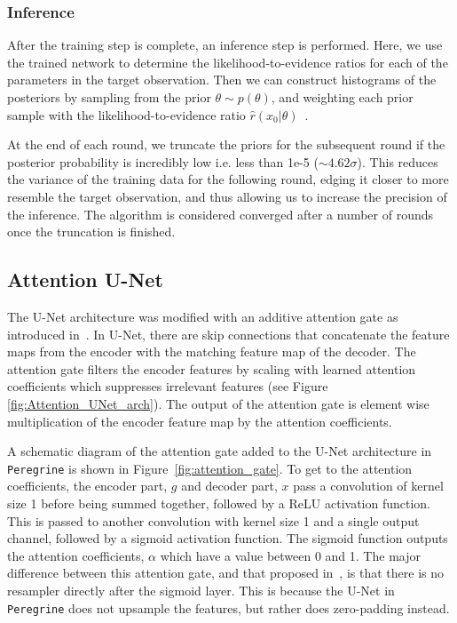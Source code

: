 \subsubsection{Inference}

After the training step is complete, an inference step is performed. Here, we use the trained network to determine the likelihood-to-evidence ratios for each of the parameters in the target observation. 
Then we can construct histograms of the posteriors by sampling from the prior $\theta \sim p(\theta)$, and weighting each prior sample with the likelihood-to-evidence ratio $\hat{r}(x_0|\theta)$~\cite{Miller_TMNRE_2021}.

At the end of each round, we truncate the priors for the subsequent round if the posterior probability is incredibly low i.e. less than 1e-5 ($\sim4.62\sigma$). This reduces the variance of the training data for the following round, edging it closer to more resemble the target observation, and thus allowing us to increase the precision of the inference. The algorithm is considered converged after a number of rounds once the truncation is finished.

\subsection{Attention U-Net}

The U-Net architecture was modified with an additive attention gate as introduced in~\cite{Oktay_2018_AUNet}. In U-Net, there are skip connections that concatenate the feature maps from the encoder with the matching feature map of the decoder. The attention gate filters the encoder features by scaling with learned attention coefficients which suppresses irrelevant features (see Figure \ref{fig:Attention_UNet_arch}). The output of the attention gate is element wise multiplication of the encoder feature map by the attention coefficients.

A schematic diagram of the attention gate added to the U-Net architecture in \texttt{Peregrine} is shown in Figure~\ref{fig:attention_gate}. To get to the attention coefficients,  the encoder part, $g$ and decoder part, $x$ pass a convolution of kernel size 1 
before being summed together, followed by a ReLU activation function. This is passed to another convolution with kernel size 1 and a single output channel, followed by a sigmoid activation function. The sigmoid function outputs the attention coefficients,  $\alpha$ which have a value between 0 and 1. The major difference between this attention gate, and that proposed in~\cite{Oktay_2018_AUNet}, is that there is no resampler directly after the sigmoid layer. This is because the U-Net in \texttt{Peregrine} does not upsample the features, but rather does zero-padding instead.

